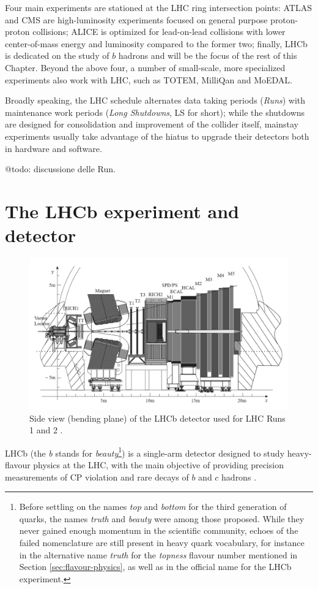 Four main experiments are stationed at the LHC ring intersection points:
ATLAS and CMS are high-luminosity experiments focused on general purpose proton-proton collisions; ALICE is optimized for lead-on-lead collisions with lower center-of-mass energy and luminosity compared to the former two; finally, LHCb is dedicated on the study of $b$ hadrons and will be the focus of the rest of this Chapter.
Beyond the above four, a number of small-scale, more specialized experiments also work with LHC, such as TOTEM, MilliQan and MoEDAL.

Broadly speaking, the LHC schedule alternates data taking periods (\textit{Runs}) with maintenance work periods (\textit{Long Shutdowns}, LS for short);
while the shutdowns are designed for consolidation and improvement of the collider itself, mainstay experiments usually take advantage of the hiatus to upgrade their detectors both in hardware and software.

@todo: discussione delle Run.


\section{The LHCb experiment and detector}

\begin{figure}[t]
	\centering
	\includegraphics[width=\textwidth]{graphics/02-lhcb/lhcb_diagram.png}
	\caption[LHCb detector side view.]{Side view (bending plane) of the LHCb detector used for LHC Runs 1 and 2 \cite{Antunes-Nobrega:630827}.}
	\label{fig:2:lhcb_diagram}
\end{figure}

LHCb (the \textit{b} stands for \textit{beauty}\footnote{Before settling on the names \textit{top} and \textit{bottom} for the third generation of quarks, the names \textit{truth} and \textit{beauty} were among those proposed. While they never gained enough momentum in the scientific community, echoes of the failed nomenclature are still present in heavy quark vocabulary, for instance in the alternative name \textit{truth} for the \textit{topness} flavour number mentioned in Section \ref{sec:flavour-physics}, as well as in the official name for the LHCb experiment.}) is a single-arm detector designed to study heavy-flavour physics at the LHC, with the main objective of providing precision measurements of CP violation and rare decays of $b$ and $c$ hadrons \cite{Alves:1129809}.

